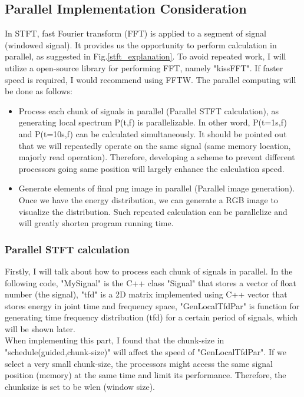 \documentclass[11pt,letter]{article}
\begin{document}
\subsection{Parallel Implementation Consideration}
In STFT, fast Fourier transform (FFT) is applied to a segment of signal (windowed signal). It provides us the opportunity to perform calculation in parallel, as suggested in Fig.\ref{stft_explanation}. To avoid repeated work, I will utilize a open-source library for performing FFT, namely "kissFFT". If faster speed is required, I would recommend using FFTW. The parallel computing will be done as follows:
\begin{itemize}
\item Process each chunk of signals in parallel (Parallel STFT calculation), as generating local spectrum P(t,f) is parallelizable. In other word, P(t=1s,f) and P(t=10s,f) can be calculated simultaneously. It should be pointed out that we will repeatedly operate on the same signal (same memory location, majorly read operation). Therefore, developing a scheme to prevent different processors going same position will largely enhance the calculation speed.

\item Generate elements of final png image in parallel (Parallel image generation). Once we have the energy distribution, we can generate a RGB image to visualize the distribution. Such repeated calculation can be parallelize and will greatly shorten program running time.
\end{itemize}

\subsubsection{Parallel STFT calculation}
Firstly, I will talk about how to process each chunk of signals in parallel. In the following code, "MySignal" is the C++ class "Signal" that stores a vector of float number (the signal), "tfd" is a 2D matrix implemented using C++ vector that stores energy in joint time and frequency space, "GenLocalTfdPar" is function for generating time frequency distribution (tfd) for a certain period of signals, which will be shown later.\\

When implementing this part, I found that the chunk-size in "schedule(guided,chunk-size)" will affect the speed of "GenLocalTfdPar". If we select a very small chunk-size, the processors might access the same signal position (memory) at the same time and limit its performance. Therefore, the chunksize is set to be wlen (window size). \\
\end{document}
